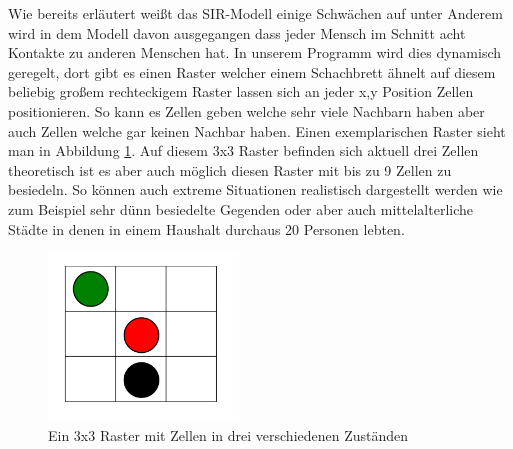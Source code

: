 Wie bereits erläutert weißt das SIR-Modell einige Schwächen auf unter Anderem wird in dem Modell davon ausgegangen dass jeder Mensch im Schnitt acht Kontakte zu anderen Menschen hat. In unserem Programm wird dies dynamisch geregelt, dort gibt es einen Raster welcher einem Schachbrett ähnelt auf diesem beliebig großem rechteckigem \glqq{}Raster\grqq{} lassen sich an jeder x,y Position Zellen positionieren. So kann es Zellen geben welche sehr viele Nachbarn haben aber auch Zellen welche gar keinen Nachbar haben. Einen exemplarischen Raster sieht man in  Abbildung \ref{fig:Raster}. Auf diesem 3x3 Raster befinden sich aktuell drei Zellen theoretisch ist es aber auch möglich diesen Raster mit bis zu 9 Zellen zu besiedeln. So können auch extreme Situationen realistisch dargestellt werden wie zum Beispiel sehr dünn besiedelte Gegenden oder aber auch mittelalterliche Städte in denen in einem Haushalt durchaus 20 Personen lebten.\\


\begin{figure}[t]
\centering
\includegraphics[width= 0.45\textwidth]{./images/nachbarn.png}
\caption{Ein 3x3 Raster mit Zellen in drei verschiedenen Zuständen}
\label{fig:Raster}
\end{figure}








